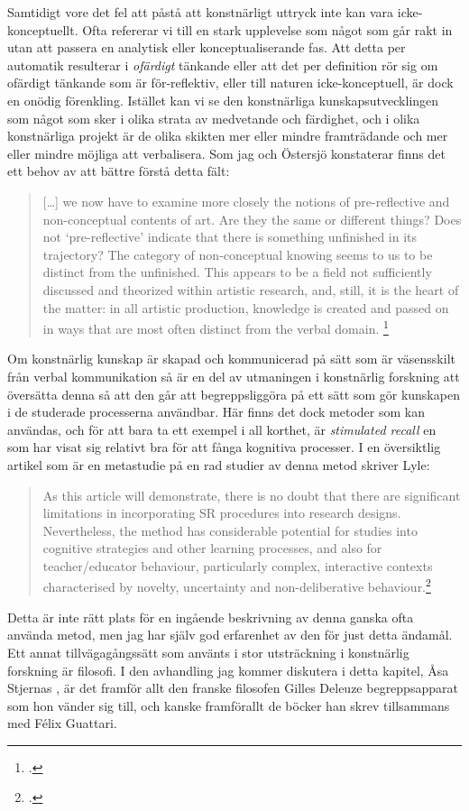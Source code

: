 \documentclass[11pt]{article}
\begin{document}
Samtidigt vore det fel att påstå att konstnärligt uttryck inte kan
vara icke-konceptuellt. Ofta refererar vi till en stark upplevelse som
något som går rakt in utan att passera en analytisk eller
konceptualiserande fas. Att detta per automatik resulterar i
\emph{ofärdigt} tänkande eller att det per definition rör sig om
ofärdigt tänkande som är för-reflektiv, eller till naturen
icke-konceptuell, är dock en onödig förenkling. Istället kan vi se den
konstnärliga kunskapsutvecklingen som något som sker i olika strata av
medvetande och färdighet, och i olika konstnärliga projekt är de olika
skikten mer eller mindre framträdande och mer eller mindre möjliga att
verbalisera. Som jag och Östersjö konstaterar finns det ett behov av att bättre
förstå detta fält:

\begin{quote} [\ldots{}] we now have to examine more closely the
    notions of pre-reflective and non-conceptual contents of art. Are
    they the same or different things? Does not ‘pre-reflective’
    indicate that there is something unfinished in its trajectory? The
    category of non-conceptual knowing seems to us to be distinct from
    the unfinished. This appears to be a field not sufficiently
    discussed and theorized within artistic research, and, still, it
    is the heart of the matter: in all artistic production, knowledge
    is created and passed on in ways that are most often distinct from
    the verbal domain. \footcite[sid. 35]{frisk-ost13}
\end{quote}

Om konstnärlig kunskap är skapad och kommunicerad på sätt som är
väsensskilt från verbal kommunikation så är en del av utmaningen i
konstnärlig forskning att översätta denna så att den går att
begreppsliggöra på ett sätt som gör kunskapen i de studerade
processerna användbar. Här finns det dock metoder som kan användas,
och för att bara ta ett exempel i all korthet, är \emph{stimulated
    recall} en som har visat sig relativt bra för att fånga kognitiva
processer. I en översiktlig artikel som är en metastudie på en rad
studier av denna metod skriver Lyle:

\begin{quote}
    As this article will demonstrate, there is no doubt that there are
    significant limitations in incorporating SR procedures into
    research designs. Nevertheless, the method has considerable
    potential for studies into cognitive strategies and other learning
    processes, and also for teacher/educator behaviour, particularly
    complex, interactive contexts characterised by novelty,
    uncertainty and non-deliberative
    behaviour.\footcite[sid. 861-2]{Lyle2003}
\end{quote}
Detta är inte rätt plats för en ingående beskrivning av denna ganska
ofta använda metod, men jag har själv god erfarenhet av den för just detta
ändamål. Ett annat tillvägagångssätt som använts i stor utsträckning i
konstnärlig forskning är filosofi. I den avhandling jag kommer
diskutera i detta kapitel, Åsa Stjernas , är
det framför allt den franske filosofen Gilles Deleuze begreppsapparat
som hon vänder sig till, och kanske framförallt de böcker han skrev
tillsammans med Félix Guattari.
\end{document}
